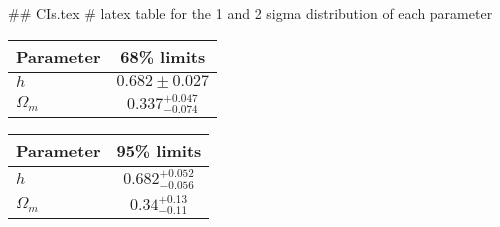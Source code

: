 ## CIs.tex
# latex table for the 1 and 2 sigma distribution of each parameter

\begin{tabular} { l  c}
 Parameter &  68\% limits\\
\hline
{\boldmath$h              $} & $0.682\pm 0.027            $\\
{\boldmath$\Omega_m       $} & $0.337^{+0.047}_{-0.074}   $\\
\hline
\end{tabular}

\begin{tabular} { l  c}
 Parameter &  95\% limits\\
\hline
{\boldmath$h              $} & $0.682^{+0.052}_{-0.056}   $\\
{\boldmath$\Omega_m       $} & $0.34^{+0.13}_{-0.11}      $\\
\hline
\end{tabular}
